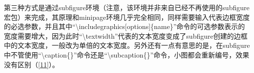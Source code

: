 \documentclass{article}
\begin{document}
    第三种方式是通过subfigure环境（注意，该环境并非来自已经不再使用的subfigure宏包）来完成，其原理和minipage环境几乎完全相同，同样需要输入代表边框宽度的必选参数，并且其中``\textbackslash includegraphics[options]\{name\}''命令的可选参数表示的宽度需要增大，因为此时``\textbackslash textwidth''代表的文本宽度变成了subfigure创建的边框中的文本宽度，一般改为单倍的文本宽度。另外还有一点有意思的是，在subfigure中不管使用``\textbackslash caption\{\}''命令还是``\textbackslash subcaption\{\}''命令，小图都会重新编号，效果没有区别（\ref{11}）。

    \begin{figure}[htbp]
        \hfill
\end{figure}
\end{document}
